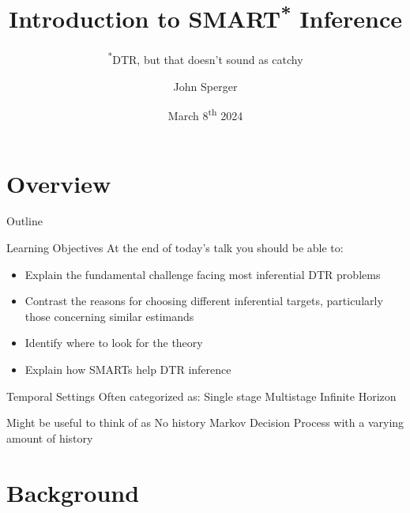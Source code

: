 \documentclass[aspectratio=169, professionalfonts]{beamer}
\author{John Sperger}
\date{March 8\textsuperscript{th} 2024}
\title{Introduction to SMART\textsuperscript{*} Inference}
\subtitle{\textsuperscript{*}DTR, but that doesn't sound as catchy}
\begin{document}
\maketitle

\section{Overview}
\begin{frame}{Outline}
	\tableofcontents[hideallsubsections]
\end{frame}

\begin{frame}[label={overview:objectives}]{Learning Objectives}
	At the end of today's talk you should be able to:
	\begin{itemize}
		\item Explain the fundamental challenge facing most inferential DTR problems
		\item Contrast the reasons for choosing different inferential targets,
		      particularly those concerning similar estimands
		\item Identify where to look for the theory
		\item Explain how SMARTs help DTR inference
	\end{itemize}
	\vfill
\end{frame}

\begin{frame}[label={overview:time}]{Temporal Settings}
	Often categorized as:
	Single stage
	Multistage
	Infinite Horizon

	Might be useful to think of as
	No history
	Markov Decision Process with a varying amount of history

\end{frame}

\section{Background}
\end{document}
